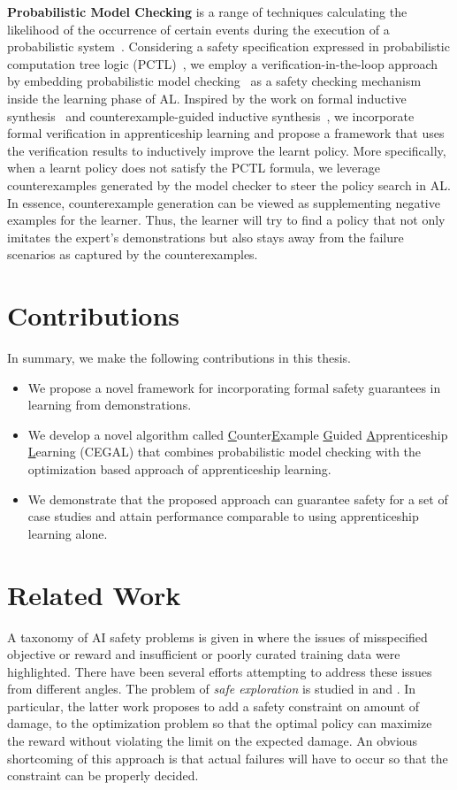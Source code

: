 {\bf Probabilistic Model Checking} is a range of techniques calculating the likelihood of the occurrence of certain events during the execution of a probabilistic system~\cite{kwiatkowska2002prism}. Considering a safety specification expressed in probabilistic computation tree logic (PCTL)~\cite{Hansson1994}, we employ a verification-in-the-loop approach by embedding probabilistic model checking~\cite{kwiatkowska2002prism} as a safety checking mechanism inside the learning phase of AL. Inspired by the work on formal inductive synthesis~\cite{jha-ai2017} and counterexample-guided inductive synthesis~\cite{CEGIS}, we incorporate formal verification in apprenticeship learning and propose a framework that uses the verification results to  inductively improve the learnt policy. 
More specifically, when a learnt policy does not satisfy the PCTL formula, we leverage counterexamples generated by the model checker to steer the policy search in AL. 
In essence, counterexample generation can be viewed as supplementing negative examples for the learner. 
Thus, the learner will try to find a policy that not only imitates the expert's demonstrations but also stays away from the failure scenarios as captured by the counterexamples. 


\section{Contributions}
In summary, we make the following contributions in this thesis. 
\begin{itemize}
\item We propose a novel framework for incorporating formal safety guarantees in learning from demonstrations.
\item We develop a novel algorithm called \underline{C}ounter\underline{E}xample \underline{G}uided \underline{A}pprenticeship \underline{L}earning (CEGAL) that combines probabilistic model checking with the optimization based approach of apprenticeship learning. 
\item We demonstrate that the proposed approach can guarantee safety for a set of case studies and attain performance comparable to using apprenticeship learning alone.
\end{itemize}


\section{Related Work}
A taxonomy of AI safety problems is given in \cite{AmodeiOSCSM16} where the issues of misspecified objective or reward and insufficient or poorly curated training data were highlighted. There have been several efforts attempting to address these issues from different angles. The problem of {\it safe exploration} is studied in \cite{moldovan2012safe} and \cite{DBLP:journals/corr/HeldMZSA17}. In particular, the latter work proposes to add a safety constraint on amount of damage, to the optimization problem so that the optimal policy can maximize the reward without violating the limit on the expected damage. An obvious shortcoming of this approach is that actual failures will have to occur so that the constraint can be properly decided.


